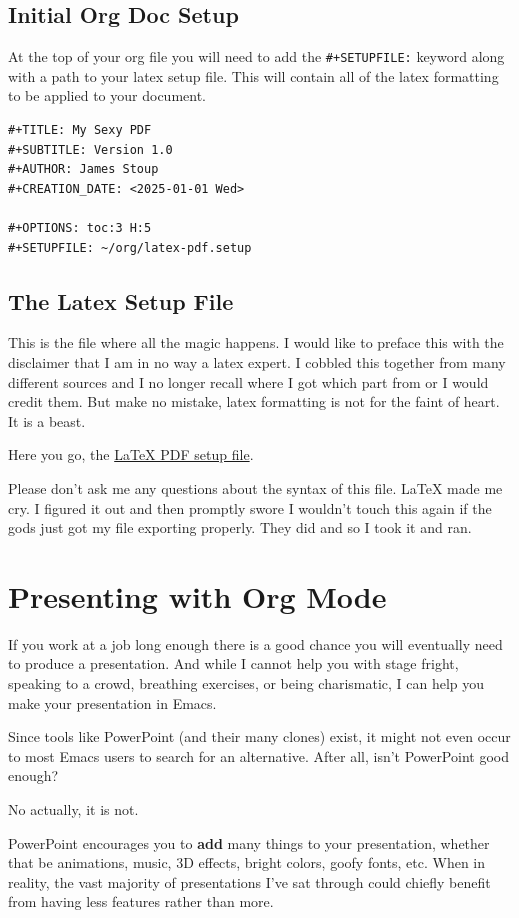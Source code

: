 \documentclass[11pt]{article}
\begin{document}
\subsection*{Initial Org Doc Setup}
\label{sec:orgf9fa336}
At the top of your org file you will need to add the \texttt{\#+SETUPFILE:} keyword along with a path to your latex setup file. This will contain all of the latex formatting to be applied to your document.

\begin{verbatim}
#+TITLE: My Sexy PDF
#+SUBTITLE: Version 1.0
#+AUTHOR: James Stoup
#+CREATION_DATE: <2025-01-01 Wed>

#+OPTIONS: toc:3 H:5
#+SETUPFILE: ~/org/latex-pdf.setup
\end{verbatim}
\subsection*{The Latex Setup File}
\label{sec:org806af5f}
This is the file where all the magic happens. I would like to preface this with the disclaimer that I am in no way a latex expert. I cobbled this together from many different sources and I no longer recall where I got which part from or I would credit them. But make no mistake, latex formatting is not for the faint of heart. It is a beast.

Here you go, the \href{latex-pdf.setup}{\LaTeX{} PDF setup file}.

Please don't ask me any questions about the syntax of this file. \LaTeX{} made me cry. I figured it out and then promptly swore I wouldn't touch this again if the gods just got my file exporting properly. They did and so I took it and ran.
\section*{Presenting with Org Mode}
\label{sec:org1c0e5a2}
If you work at a job long enough there is a good chance you will eventually need to produce a presentation. And while I cannot help you with stage fright, speaking to a crowd, breathing exercises, or being charismatic, I can help you make your presentation in Emacs.

Since tools like PowerPoint (and their many clones) exist, it might not even occur to most Emacs users to search for an alternative. After all, isn't PowerPoint good enough?

No actually, it is not.

PowerPoint encourages you to \textbf{add} many things to your presentation, whether that be animations, music, 3D effects, bright colors, goofy fonts, etc. When in reality, the vast majority of presentations I've sat through could chiefly benefit from having less features rather than more.
\end{document}
